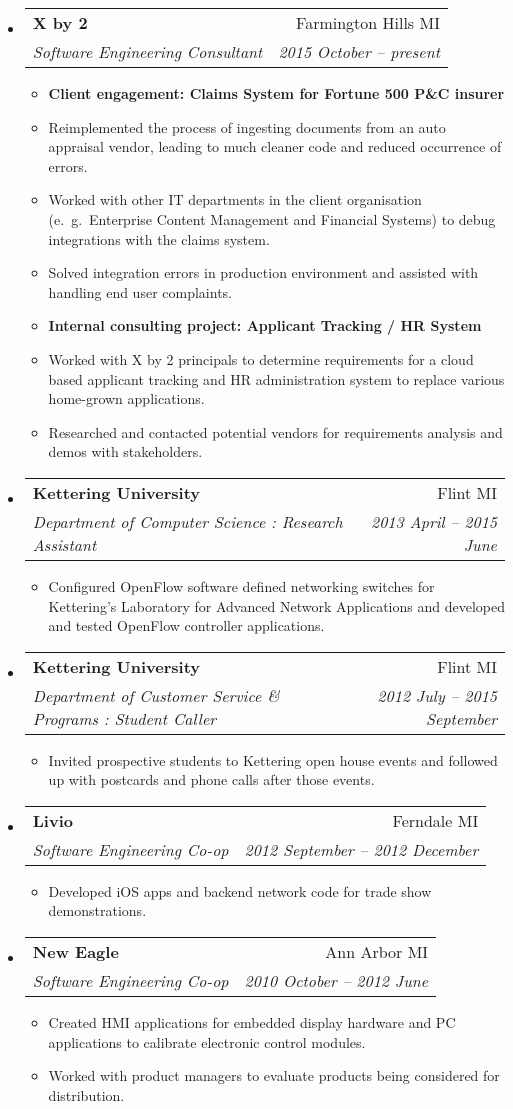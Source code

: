 \documentclass[letterpaper,10pt]{article}
\makeatletter
\newcommand{\resitem}[1]{\item #1 \vspace{-2pt}}
\newcommand{\ressubheading}[4]{
\begin{tabular*}{6.5in}{l@{\cftdotfill{\cftsecdotsep}\extracolsep{\fill}}r}
        \textbf{#1} & #2 \\
        \textit{#3} & \textit{#4} \\
\end{tabular*}\vspace{-6pt}}
\makeatother
\begin{document}
\begin{itemize}

\item
\ressubheading{X by 2}{Farmington Hills MI}{Software Engineering Consultant}{2015 October -- present}
\begin{itemize}\small
    \resitem{{\bf Client engagement: Claims System for Fortune 500 P\&C insurer}}
    \resitem{Reimplemented the process of ingesting documents from an auto appraisal vendor,
             leading to much cleaner code and reduced occurrence of errors.}
    \resitem{Worked with other IT departments in the client organisation (e.\ g.\ Enterprise Content Management 
             and Financial Systems) to debug integrations with the claims system.}
    \resitem{Solved integration errors in production environment and assisted with handling end user complaints.}
    \resitem{{\bf Internal consulting project: Applicant Tracking / HR System}}
    \resitem{Worked with X by 2 principals to determine requirements for a cloud based applicant tracking
             and HR administration system to replace various home-grown applications.}
    \resitem{Researched and contacted potential vendors for requirements analysis and demos with stakeholders.}
\end{itemize}

\item
\ressubheading{Kettering University}{Flint MI}{Department of Computer Science : Research Assistant}{2013 April -- 2015 June}
\begin{itemize}\small
    \resitem{Configured OpenFlow software defined networking switches for Kettering's 
    	     Laboratory for Advanced Network Applications and developed and tested OpenFlow controller applications.}
\end{itemize}
    
\item
\ressubheading{Kettering University}{Flint MI}{Department of Customer Service \& Programs : Student Caller}{2012 July -- 2015 September}
\begin{itemize}\small
    \resitem{Invited prospective students to Kettering open house events and followed up with postcards 
             and phone calls after those events.}
\end{itemize}

\item
\ressubheading{Livio}{Ferndale MI}{Software Engineering Co-op}{2012 September -- 2012 December}
\begin{itemize}\small
    \resitem{Developed iOS apps and backend network code for trade show demonstrations.}
\end{itemize}

\item
\ressubheading{New Eagle}{Ann Arbor MI}{Software Engineering Co-op}{2010 October -- 2012 June}
\begin{itemize}\small
    \resitem{Created HMI applications for embedded display hardware and PC applications to calibrate electronic control modules.}
    \resitem{Worked with product managers to evaluate products being considered for distribution.}
\end{itemize}

\end{itemize}
\end{document}
